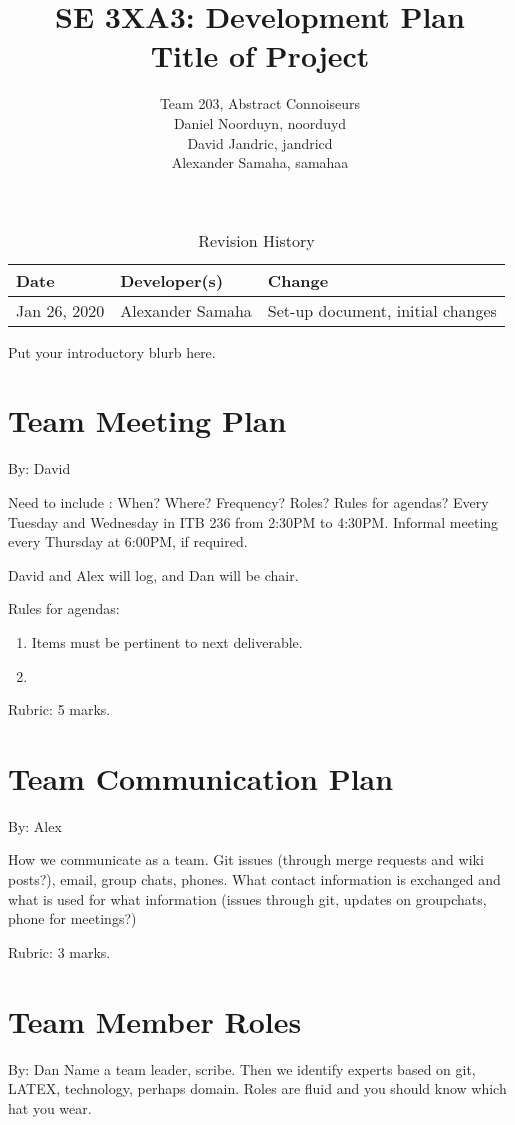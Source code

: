 \documentclass{article}
\title{SE 3XA3: Development Plan\\Title of Project}
\author{Team 203, Abstract Connoiseurs\\
Daniel Noorduyn, noorduyd\\
David Jandric, jandricd\\
Alexander Samaha, samahaa\\
}
\date{}
\begin{document}
\begin{table}[hp]
\caption{Revision History} \label{TblRevisionHistory}
\begin{tabularx}{\textwidth}{llX}
\toprule
\textbf{Date} & \textbf{Developer(s)} & \textbf{Change}\\
\midrule
Jan 26, 2020 & Alexander Samaha & Set-up document, initial changes\\
\bottomrule
\end{tabularx}
\end{table}

\newpage

\maketitle

Put your introductory blurb here.

\section{Team Meeting Plan}

By: David

Need to include :  When?  Where?  Frequency?  Roles?  Rules for agendas?
Every Tuesday and Wednesday in ITB 236 from 2:30PM to 4:30PM.
Informal meeting every Thursday at 6:00PM, if required.

David and Alex will log, and Dan will be chair.

Rules for agendas:
\begin{enumerate}
    \item Items must be pertinent to next deliverable.
    \item 
\end{enumerate}


Rubric:  5 marks.

\section{Team Communication Plan}
By: Alex

How we communicate as a team.  Git issues (through merge requests and wiki
posts?), email, group chats, phones.  What contact information is exchanged and
what is used for what information (issues through git,  updates on groupchats,
phone for meetings?)

Rubric:  3 marks.

\section{Team Member Roles}
By: Dan
Name  a  team  leader,  scribe.   Then  we  identify  experts  based  on  git,  
LATEX,
technology,  perhaps  domain.   Roles  are  fluid  and  you  should  know  
which  hat
you wear.
\end{document}
